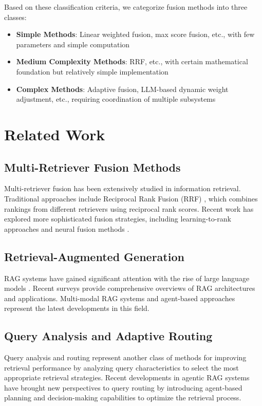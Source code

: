 \documentclass[letterpaper]{article} %
\begin{document}
Based on these classification criteria, we categorize fusion methods into three classes:
\begin{itemize}
\item \textbf{Simple Methods}: Linear weighted fusion, max score fusion, etc., with few parameters and simple computation
\item \textbf{Medium Complexity Methods}: RRF, etc., with certain mathematical foundation but relatively simple implementation
\item \textbf{Complex Methods}: Adaptive fusion, LLM-based dynamic weight adjustment, etc., requiring coordination of multiple subsystems
\end{itemize}

\section{Related Work}

\subsection{Multi-Retriever Fusion Methods}

Multi-retriever fusion has been extensively studied in information retrieval. Traditional approaches include Reciprocal Rank Fusion (RRF) \cite{cormack2009reciprocal}, which combines rankings from different retrievers using reciprocal rank scores. Recent work has explored more sophisticated fusion strategies, including learning-to-rank approaches \cite{liu2009learning} and neural fusion methods \cite{zamani2018neural}.

\subsection{Retrieval-Augmented Generation}

RAG systems have gained significant attention with the rise of large language models \cite{lewis2020retrieval}. Recent surveys \cite{gao2024retrieval} provide comprehensive overviews of RAG architectures and applications. Multi-modal RAG systems \cite{chen2022multimodal} and agent-based approaches \cite{singh2025agentic} represent the latest developments in this field.

\subsection{Query Analysis and Adaptive Routing}

Query analysis and routing represent another class of methods for improving retrieval performance by analyzing query characteristics to select the most appropriate retrieval strategies. Recent developments in agentic RAG systems \cite{singh2025agentic} have brought new perspectives to query routing by introducing agent-based planning and decision-making capabilities to optimize the retrieval process.
\end{document}
